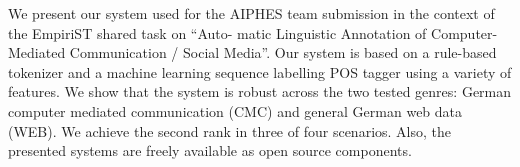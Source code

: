 We present our system used for the AIPHES team submission in the context of the EmpiriST shared task on ``Auto- matic Linguistic Annotation of Computer-Mediated Communication / Social Media''. Our system is based on a rule-based tokenizer and a machine learning sequence labelling POS tagger using a variety of features. We show that the system is robust across the two tested genres: German computer mediated communication (CMC) and general German web data (WEB). We achieve the second rank in three of four scenarios. Also, the presented systems are freely available as open source components.

